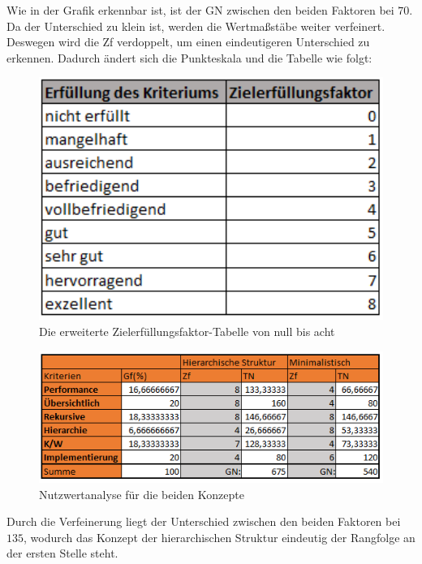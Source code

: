 Wie in der Grafik erkennbar ist, ist der \ac{GN} zwischen den beiden Faktoren bei $70$.
Da der Unterschied zu klein ist, werden die Wertmaßstäbe weiter verfeinert.
Deswegen wird die \ac{Zf} verdoppelt, um einen eindeutigeren Unterschied zu erkennen.
Dadurch ändert sich die Punkteskala und die Tabelle wie folgt:
\begin{figure}[h!]
 \centering
 \includegraphics[width=1\textwidth]{gfx/Picture/Ziel2.PNG}
 \caption{Die erweiterte Zielerfüllungsfaktor-Tabelle von null bis acht}
 \label{fig:Ziel}
\end{figure}
\newpage
\begin{figure}[h!]
 \centering
 \includegraphics[width=1\textwidth]{gfx/Picture/Nutzwert2.PNG}
 \caption{Nutzwertanalyse für die beiden Konzepte}
 \label{fig:Nutz}
\end{figure}
Durch die Verfeinerung liegt der Unterschied zwischen den beiden Faktoren bei $135$, wodurch das Konzept der hierarchischen Struktur eindeutig der Rangfolge an der ersten Stelle steht.

